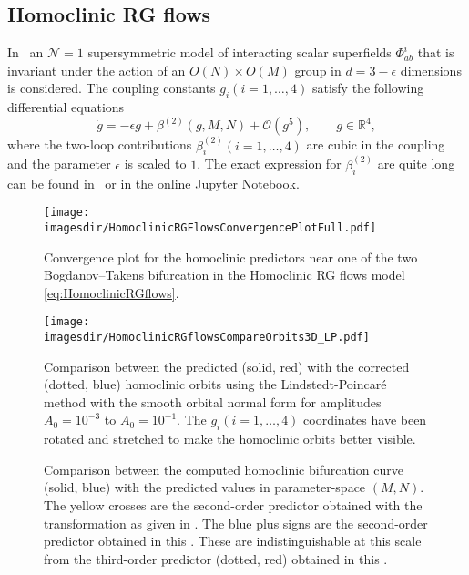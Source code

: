 \subsection{Homoclinic RG flows}
In~\cite{Jepsen2021HomoclinicRG} an $\mathcal N = 1$ supersymmetric model of interacting
scalar superfields $\Phi_{ab}^i$ that is invariant under the action of an $O(N)
\times O(M)$ group in $d = 3 - \epsilon$ dimensions is considered.
The coupling constants $g_i(i=1,\dots,4)$ satisfy the following differential
equations
\begin{equation}
    \label{eq:HomoclinicRGflows}
    \dot g = -\epsilon g + \beta^{(2)}(g,M,N) + \mathcal O(g^5),  \qquad g\in\mathbb R^4,
\end{equation} 
where the two-loop contributions $\beta_i^{(2)}(i=1,\dots,4)$ are cubic in the
coupling and the parameter $\epsilon$ is scaled to $1$.  The exact expression for
$\beta_i^{(2)}$ are quite long can be found in~\cite[Appendix B]{Jepsen2021HomoclinicRG}
or in the \href{https://mmbosschaert.github.io/MatCont7p2NewInitBTHom-/}{online Jupyter
Notebook}.
\begin{figure}[b!]
    \texttt{[image: \\imagesdir/HomoclinicRGFlowsConvergencePlotFull.pdf]}
    \caption{Convergence plot for the homoclinic predictors near one of the
        two Bogdanov--Takens bifurcation in the Homoclinic RG flows model 
        \cref{eq:HomoclinicRGflows}.}
    \label{fig:HomoclinicRGFlowsConvergencePlot}
\end{figure}
%
\begin{figure}[t!]
    \texttt{[image: \\imagesdir/HomoclinicRGflowsCompareOrbits3D\_LP.pdf]}
    \caption{Comparison between the predicted (solid, red) with the corrected
        (dotted, blue) homoclinic orbits using the Lindstedt-Poincar\'e method
        with the smooth orbital normal form for amplitudes $A_0 = 10^{-3}$ to
        $A_0=10^{-1}$. The $g_i(i=1,\dots,4)$ coordinates have been rotated and stretched
        to make the homoclinic orbits better visible.}
    \label{fig:HomoclinicRGFlows}
\end{figure}
%
\ifthesis
\begin{figure}[t!]
\caption{Comparison between the computed homoclinic bifurcation curve
    (solid, blue) with the predicted values in parameter-space $(M,N)$.
    The yellow crosses are the second-order predictor obtained with the
    transformation as given in {\cite{Al-Hdaibat2016}}. The blue plus
    signs are the second-order predictor obtained in this \paper{}. These are
    indistinguishable at this scale from the third-order
    predictor (dotted, red) obtained in this \paper{}.}
\label{fig:HomoclinicRGFlowsParameters}
\end{figure}
\fi

